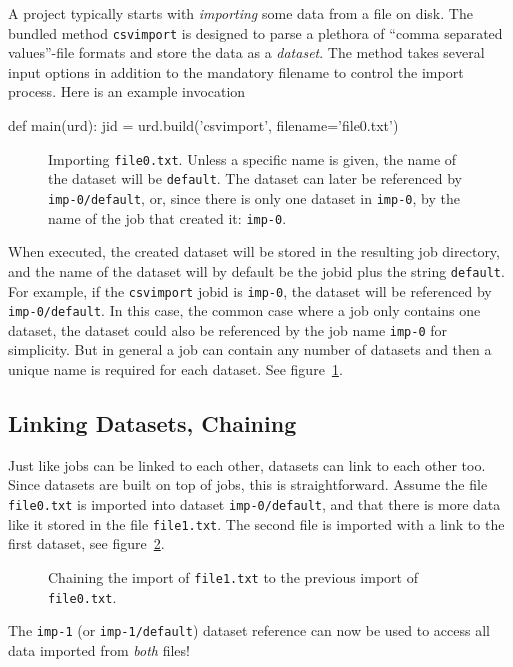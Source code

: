 A project typically starts with \textsl{importing} some data from a
file on disk.  The bundled method \texttt{csvimport} is designed to
parse a plethora of ``comma separated values''-file formats and store
the data as a \emph{dataset}.
The method takes several input options in addition to the mandatory
filename to control the import process.  Here is an example
invocation
\begin{python}
def main(urd):
    jid = urd.build('csvimport', filename='file0.txt')
\end{python}

\begin{figure}[b]
  \begin{center}
    
    \caption{Importing \texttt{file0.txt}.  Unless a specific name is
      given, the name of the dataset will be \texttt{default}.  The
      dataset can later be referenced by \texttt{imp-0/default}, or,
      since there is only one dataset in \texttt{imp-0}, by the name
      of the job that created it: \texttt{imp-0}.}
    \label{fig:dataset_csvimport}
  \end{center}
\end{figure}

When executed, the created dataset will be stored in the resulting job
directory, and the name of the dataset will by default be the jobid
plus the string \texttt{default}.  For example, if the
\texttt{csvimport} jobid is \texttt{imp-0}, the dataset will be
referenced by \texttt{imp-0/default}.  In this case, the common case
where a job only contains one dataset, the dataset could also be
referenced by the job name \texttt{imp-0} for simplicity.  But in
general a job can contain any number of datasets and then a unique
name is required for each dataset.  See
figure~\ref{fig:dataset_csvimport}.


\clearpage

\subsection{Linking Datasets, Chaining}

Just like jobs can be linked to each other, datasets can link to each
other too.  Since datasets are built on top of jobs, this is
straightforward.  Assume the file \texttt{file0.txt} is imported into
dataset \texttt{imp-0/default}, and that there is more data like it
stored in the file \texttt{file1.txt}.  The second file is imported
with a link to the first dataset, see
figure~\ref{fig:dataset_csvimport_chain}.
\begin{figure}[t]
  \begin{center}
    
    \caption{Chaining the import of \texttt{file1.txt} to the previous
      import of \texttt{file0.txt}.}
    \label{fig:dataset_csvimport_chain}
  \end{center}
\end{figure}
The \texttt{imp-1} (or \texttt{imp-1/default}) dataset reference can
now be used to access all data imported from \textsl{both} files!

